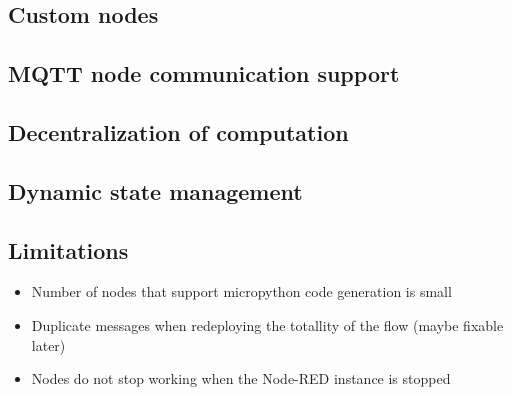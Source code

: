 \subsection{Custom nodes}

\subsection{MQTT node communication support}

\subsection{Decentralization of computation}

\subsection{Dynamic state management}

\subsection{Limitations}

\begin{itemize}
    \item Number of nodes that support micropython code generation is small
    \item Duplicate messages when redeploying the totallity of the flow (maybe fixable later)
    \item Nodes do not stop working when the Node-RED instance is stopped
\end{itemize}
